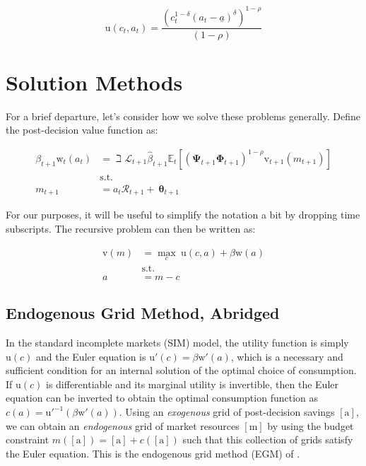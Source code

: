 \documentclass{article}
\newcommand{\DiscFac}{\beta}
\newcommand{\uFunc}{\mathrm{u}}
\newcommand{\vFunc}{\mathrm{v}}
\newcommand{\Alive}{\mathcal{L}}
\newcommand{\Ex}{\mathbb{E}}
\newcommand{\CRRA}{\rho}
\newcommand{\PermGroFac}{\pmb{\Phi}}
\newcommand{\PermShk}{\mathbf{\Psi}}
\newcommand{\aNrm}{a}
\newcommand{\cNrm}{c}
\newcommand{\RNrm}{\mathcal{R}}
\newcommand{\TranShkEmp}{\pmb{\theta}}
\newcommand{\mNrm}{m}
\newcommand{\wealthShare}{\delta}
\newcommand{\wFunc}{\mathrm{w}}
\newcommand{\aRat}{a}
\newcommand{\mRat}{m}
\newcommand{\aMat}{[\mathrm{a}]}
\newcommand{\mMat}{[\mathrm{m}]}
\begin{document}
\begin{equation}
\uFunc(\cNrm_{t}, \aNrm_{t}) = \frac{(\cNrm_{t}^{1-\wealthShare} (\aNrm_{t} - \underline\aNrm)^\wealthShare)^{1-\CRRA}}{(1-\CRRA)}
\end{equation}

\section{Solution Methods}\label{Solution Methods}

For a brief departure, let's consider how we solve these problems generally. Define the post-decision value function as:

\begin{equation}
\begin{align}
    \DiscFac_{t+1} \wFunc_{t}(\aNrm_{t}) & = \beth\Alive_{t+1}\hat{\DiscFac}_{t+1}
    \Ex_{t}[(\PermShk_{t+1}\PermGroFac_{t+1})^{1-\CRRA}{\vFunc}_{t+1}({m}_{t+1})]
    \\ & \text{s.t.}
    \\ {m}_{t+1} & = \aNrm_{t}\RNrm_{t+1}+ ~\TranShkEmp_{t+1}
\end{align}
\end{equation}

For our purposes, it will be useful to simplify the notation a bit by dropping time subscripts. The recursive problem can then be written as:

\begin{equation}
\begin{align}
    \vFunc(\mRat) & = \max_{\cNrm} ~ \uFunc(\cNrm, \aNrm) + \DiscFac \wFunc(\aRat)
    \\ & \text{s.t.}
    \\ \aNrm & = \mRat-\cNrm
\end{align}
\end{equation}

\subsection{Endogenous Grid Method, Abridged}\label{Endogenous Grid Method, Abridged}

In the standard incomplete markets (SIM) model, the utility function is simply $\uFunc(\cNrm)$ and the Euler equation is $\uFunc'(\cNrm) = \DiscFac \wFunc'(\aNrm)$, which is a necessary and sufficient condition for an internal solution of the optimal choice of consumption. If $\uFunc(\cNrm)$ is differentiable and its marginal utility is invertible, then the Euler equation can be inverted to obtain the optimal consumption function as $\cNrm(\aNrm) = \uFunc'^{ -1}(\DiscFac \wFunc'(\aNrm))$. Using an \textit{exogenous} grid of post-decision savings $\aMat$, we can obtain an \textit{endogenous} grid of market resources $\mMat$ by using the budget constraint $\mNrm(\aMat) = \aMat + \cNrm(\aMat)$ such that this collection of grids satisfy the Euler equation. This is the endogenous grid method (EGM) of \cite{Carroll_2006}.
\end{document}
